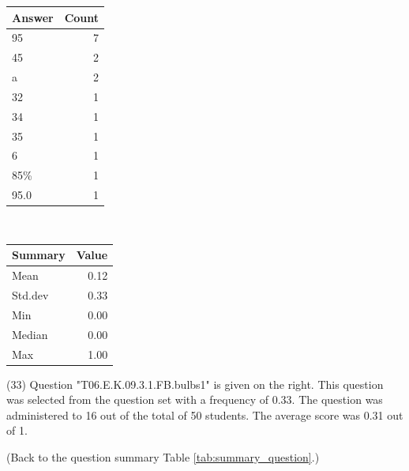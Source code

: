 \documentclass[12pt,english,nohyper]{tufte-handout}\usepackage[]{graphicx}\usepackage[]{color}
\begin{document}
\begin{center}%
\begin{tabular}{lr}
  \hline
Answer & Count \\ 
  \hline
95 &   7 \\ 
  45 &   2 \\ 
  a &   2 \\ 
  32 &   1 \\ 
  34 &   1 \\ 
  35 &   1 \\ 
  6 &   1 \\ 
  85\% &   1 \\ 
  95.0 &   1 \\ 
   \hline
\end{tabular}
~~~~~~~~%
\begin{tabular}{lr}
  \hline
Summary & Value \\ 
  \hline
Mean & 0.12 \\ 
  Std.dev & 0.33 \\ 
  Min & 0.00 \\ 
  Median & 0.00 \\ 
  Max & 1.00 \\ 
   \hline
\end{tabular}
\end{center}\newpage{} (33) Question "T06.E.K.09.3.1.FB.bulbs1" is given on the right. This question was selected from the question set with a frequency of 0.33. The question was administered to 16 out of the total of 50 students. The average score was 0.31 out of 1.

 (Back to the question summary Table \ref{tab:summary_question}.)
\end{document}
